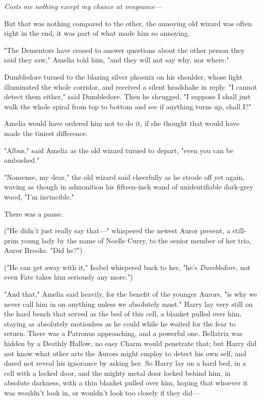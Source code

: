 \emph{Costs me nothing except my chance at vengeance---}

But that was nothing compared to the other, the annoying old wizard was often
right in the end, it was part of what made him so annoying.

"The Dementors have ceased to answer questions about the other person they said
they saw," Amelia told him, "and they will not say why, nor where."

Dumbledore turned to the blazing silver phoenix on his shoulder, whose light
illuminated the whole corridor, and received a silent headshake in reply. "I
cannot detect them either," said Dumbledore. Then he shrugged. "I suppose I
shall just walk the whole spiral from top to bottom and see if anything turns
up, shall I?"

Amelia would have ordered him not to do it, if she thought that would have made
the tiniest difference.

"Albus," said Amelia as the old wizard turned to depart, "even you can be
ambushed."

"Nonsense, my dear," the old wizard said cheerfully as he strode off yet again,
waving as though in admonition his fifteen-inch wand of unidentifiable
dark-grey wood, "I'm invincible."

There was a pause.

("He didn't just really say that---" whispered the newest Auror present, a
still-prim young lady by the name of Noelle Curry, to the senior member of her
trio, Auror Brooks. "Did he?")

("He can get away with it," Isabel whispered back to her, "he's
\emph{Dumbledore,} not even Fate takes him seriously any more.")

"And that," Amelia said heavily, for the benefit of the younger Aurors, "is why
we never call him in on anything unless we absolutely must."
\later
Harry lay very still on the hard bench that served as the bed of this cell, a
blanket pulled over him, staying as absolutely motionless as he could while he
waited for the fear to return. There was a Patronus approaching, and a powerful
one. Bellatrix was hidden by a Deathly Hallow, no easy Charm would penetrate
that; but Harry did not know what other arts the Aurors might employ to detect
his own self, and dared not reveal his ignorance by asking her. So Harry lay on
a hard bed, in a cell with a locked door, and the mighty metal door locked
behind him, in absolute darkness, with a thin blanket pulled over him, hoping
that whoever it was wouldn't look in, or wouldn't look too closely if they
did---

